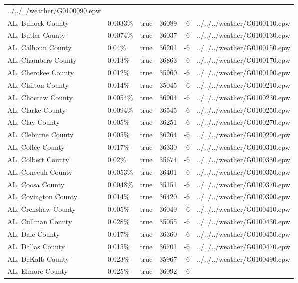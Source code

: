 \begin{longtable}[]{@{}llllll@{}}
../../../weather/G0100090.epw \\
AL, Bullock County & 0.0033\% & true & 36089 & -6 &
../../../weather/G0100110.epw \\
AL, Butler County & 0.0074\% & true & 36037 & -6 &
../../../weather/G0100130.epw \\
AL, Calhoun County & 0.04\% & true & 36201 & -6 &
../../../weather/G0100150.epw \\
AL, Chambers County & 0.013\% & true & 36863 & -6 &
../../../weather/G0100170.epw \\
AL, Cherokee County & 0.012\% & true & 35960 & -6 &
../../../weather/G0100190.epw \\
AL, Chilton County & 0.014\% & true & 35045 & -6 &
../../../weather/G0100210.epw \\
AL, Choctaw County & 0.0054\% & true & 36904 & -6 &
../../../weather/G0100230.epw \\
AL, Clarke County & 0.0094\% & true & 36545 & -6 &
../../../weather/G0100250.epw \\
AL, Clay County & 0.005\% & true & 36251 & -6 &
../../../weather/G0100270.epw \\
AL, Cleburne County & 0.005\% & true & 36264 & -6 &
../../../weather/G0100290.epw \\
AL, Coffee County & 0.017\% & true & 36330 & -6 &
../../../weather/G0100310.epw \\
AL, Colbert County & 0.02\% & true & 35674 & -6 &
../../../weather/G0100330.epw \\
AL, Conecuh County & 0.0053\% & true & 36401 & -6 &
../../../weather/G0100350.epw \\
AL, Coosa County & 0.0048\% & true & 35151 & -6 &
../../../weather/G0100370.epw \\
AL, Covington County & 0.014\% & true & 36420 & -6 &
../../../weather/G0100390.epw \\
AL, Crenshaw County & 0.005\% & true & 36049 & -6 &
../../../weather/G0100410.epw \\
AL, Cullman County & 0.028\% & true & 35055 & -6 &
../../../weather/G0100430.epw \\
AL, Dale County & 0.017\% & true & 36360 & -6 &
../../../weather/G0100450.epw \\
AL, Dallas County & 0.015\% & true & 36701 & -6 &
../../../weather/G0100470.epw \\
AL, DeKalb County & 0.023\% & true & 35967 & -6 &
../../../weather/G0100490.epw \\
AL, Elmore County & 0.025\% & true & 36092 & -6 &

\end{longtable}
